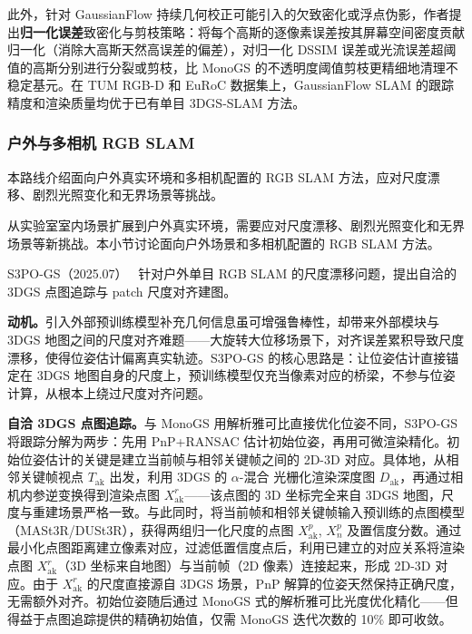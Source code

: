 此外，针对 GaussianFlow 持续几何校正可能引入的欠致密化或浮点伪影，作者提出\textbf{归一化误差}致密化与剪枝策略：将每个高斯的逐像素误差按其屏幕空间密度贡献归一化（消除大高斯天然高误差的偏差），对归一化 DSSIM 误差或光流误差超阈值的高斯分别进行分裂或剪枝，比 MonoGS 的不透明度阈值剪枝更精细地清理不稳定基元。在 TUM RGB-D 和 EuRoC 数据集上，GaussianFlow SLAM 的跟踪精度和渲染质量均优于已有单目 3DGS-SLAM 方法。

\subsubsection{户外与多相机 RGB SLAM}

本路线介绍面向户外真实环境和多相机配置的 RGB SLAM 方法，应对尺度漂移、剧烈光照变化和无界场景等挑战。

从实验室室内场景扩展到户外真实环境，需要应对尺度漂移、剧烈光照变化和无界场景等新挑战。本小节讨论面向户外场景和多相机配置的 RGB SLAM 方法。

S3PO-GS（2025.07）~\cite{2507_03737} 针对户外单目 RGB SLAM 的尺度漂移问题，提出自洽的 3DGS 点图追踪与 patch 尺度对齐建图。

\textbf{动机。}引入外部预训练模型补充几何信息虽可增强鲁棒性，却带来外部模块与 3DGS 地图之间的尺度对齐难题——大旋转大位移场景下，对齐误差累积导致尺度漂移，使得位姿估计偏离真实轨迹。S3PO-GS 的核心思路是：让位姿估计直接锚定在 3DGS 地图自身的尺度上，预训练模型仅充当像素对应的桥梁，不参与位姿计算，从根本上绕过尺度对齐问题。

\textbf{自洽 3DGS 点图追踪。}与 MonoGS 用解析雅可比直接优化位姿不同，S3PO-GS 将跟踪分解为两步：先用 PnP+RANSAC 估计初始位姿，再用可微渲染精化。初始位姿估计的关键是建立当前帧与相邻关键帧之间的 2D-3D 对应。具体地，从相邻关键帧视点 $T_{\mathrm{ak}}$ 出发，利用 3DGS 的 $\alpha$-混合 光栅化渲染深度图 $D_{\mathrm{ak}}$，再通过相机内参逆变换得到渲染点图 $X_{\mathrm{ak}}^r$——该点图的 3D 坐标完全来自 3DGS 地图，尺度与重建场景严格一致。与此同时，将当前帧和相邻关键帧输入预训练的点图模型（MASt3R/DUSt3R），获得两组归一化尺度的点图 $X_{\mathrm{ak}}^p$, $X_n^p$ 及置信度分数。通过最小化点图距离建立像素对应，过滤低置信度点后，利用已建立的对应关系将渲染点图 $X_{\mathrm{ak}}^r$（3D 坐标来自地图）与当前帧（2D 像素）连接起来，形成 2D-3D 对应。由于 $X_{\mathrm{ak}}^r$ 的尺度直接源自 3DGS 场景，PnP 解算的位姿天然保持正确尺度，无需额外对齐。初始位姿随后通过 MonoGS 式的解析雅可比光度优化精化——但得益于点图追踪提供的精确初始值，仅需 MonoGS 迭代次数的 10\% 即可收敛。

